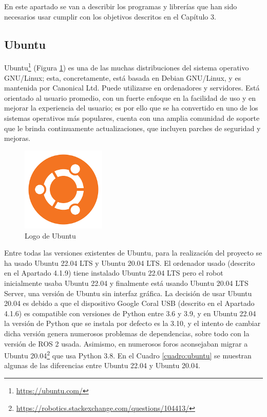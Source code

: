 En este apartado se van a describir los programas y librerías que han sido necesarios usar cumplir con los objetivos descritos en el Capítulo 3.

\subsection{Ubuntu}

Ubuntu\footnote{\url{https://ubuntu.com/}} (Figura \ref{fig:ubuntu}) es una de las muchas distribuciones del sistema operativo GNU/Linux; esta, concretamente, está basada en Debian GNU/Linux, y es mantenida por Canonical Ltd. Puede utilizarse en ordenadores y servidores. Está orientado al usuario promedio, con un fuerte enfoque en la facilidad de uso y en mejorar la experiencia del usuario; es por ello que se ha convertido en uno de los sistemas operativos más populares, cuenta con una amplia comunidad de soporte que le brinda continuamente actualizaciones, que incluyen parches de seguridad y mejoras.

\begin{figure} [h!]
	\begin{center}
		\includegraphics[width=4cm]{figs/ubuntu.png}
	\end{center}
	\caption{Logo de Ubuntu} %
	\label{fig:ubuntu}
\end{figure}


Entre todas las versiones existentes de Ubuntu, para la realización del proyecto se ha usado Ubuntu 22.04 LTS y Ubuntu 20.04 LTS. El ordenador usado (descrito en el Apartado 4.1.9) tiene instalado Ubuntu 22.04 \ac{LTS} pero el robot inicialmente usaba Ubuntu 22.04 y finalmente está usando Ubuntu 20.04 \acs{LTS} Server, una versión de Ubuntu sin interfaz gráfica. La decisión de usar Ubuntu 20.04 es debido a que el dispositivo Google Coral USB (descrito en el Apartado 4.1.6) es compatible con versiones de Python entre 3.6 y 3.9, y en Ubuntu 22.04 la versión de Python que se instala por defecto es la 3.10, y el intento de cambiar dicha versión genera numerosos problemas de dependencias, sobre todo con la versión de ROS 2 usada. Asimismo, en numerosos foros aconsejaban migrar a Ubuntu 20.04\footnote{\url{https://robotics.stackexchange.com/questions/104413/}} que usa Python 3.8. En el Cuadro \ref{cuadro:ubuntu} se muestran algunas de las diferencias entre Ubuntu 22.04 y Ubuntu 20.04.


